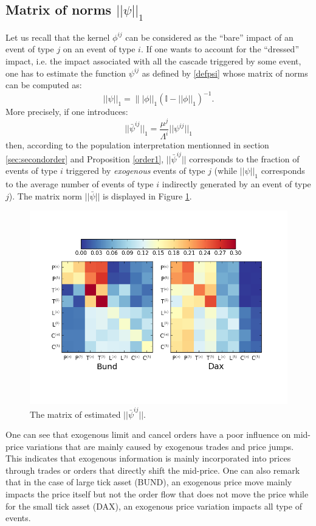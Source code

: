 \documentclass[a4paper,11pt]{article}
\begin{document}
\subsection{Matrix of norms $||\psi||_1$}
Let us recall that the kernel $\phi^{ij}$ can be considered
as the ``bare'' impact of an event of type $j$ on an event of type $i$. If one wants to account for the ``dressed'' impact, i.e. the impact associated with all the cascade
triggered by some event, one has to estimate the function $\psi^{ij}$ as defined by \eqref{defpsi} whose matrix of norms can be computed as:
$$||\psi||_1=\||\phi||_1(\mathbb{I}-||\phi||_1)^{-1}.$$
More precisely, if one introduces:
$$||\bar{\psi}^{ij}||_1 = \frac{\mu^j}{\Lambda^i} ||\psi^{ij}||_1$$
then, according to the population interpretation mentionned in section \ref{sec:secondorder} and Proposition \ref{order1}, $||\bar{\psi}^{ij}||$ corresponds to the fraction of events of type $i$ triggered by {\em exogenous} events of type $j$ (while $||\psi||_1$ corresponds to the average number of events of type $i$ indirectly generated by an event of type $j$).
The matrix norm $||\bar{\psi}||$ is displayed in Figure \ref{normpsitilde}.
\begin{figure}[H]
\centering
\includegraphics[width=\textwidth]{fignormpsi1.png}
\vspace{-59pt}
\caption{The matrix of estimated $||\bar{\psi}^{ij}||$.}
\label{normpsitilde}
\end{figure}

\noindent One can see that exogenous limit and cancel orders have a poor
influence on mid-price variations that are mainly caused
by exogenous trades and price jumps. This indicates that exogenous information is mainly incorporated into
prices through trades or orders that directly shift the mid-price. One
can also remark that in the case of large tick asset (BUND), an exogenous price move mainly impacts the price itself but not the order flow that does not move
the price while for the small tick asset (DAX), an exogenous
price variation impacts all type of events.
\end{document}
